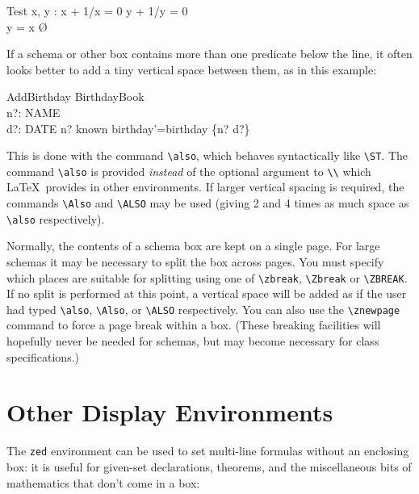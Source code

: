\documentclass[a4paper]{article}
\begin{document}
\begin{example}
\begin{schema}{Test}
x, y : \nat
\ST
x + 1/x = 0 \imp \M y + 1/y = 0 \\
y = x \O \\
\end{schema}
\end{example}

If a schema or other box contains more than one predicate below the
line, it often looks better to add a tiny vertical space between
them, as in this example:

\begin{example}
\begin{schema}{AddBirthday}
  \Delta BirthdayBook \\
  n?: NAME \\
  d?: DATE
\ST
  n? \nem known
\also
  birthday'=birthday \uni \{n? \map d?\}
\end{schema}
\end{example}

This is done with the command \verb|\also|, which behaves syntactically
like \verb|\ST|.
The command \verb|\also| is provided {\em instead\/} of the
optional argument to \verb|\\|
which \LaTeX\ provides in other environments.
If larger vertical spacing is required, the commands
\verb|\Also| and \verb|\ALSO| may be used (giving 2 and 4 times
as much space as \verb|\also| respectively).

Normally, the contents of a schema box are kept on a single page.
For large schemas it may be necessary to split the box across pages.
You must specify which places are suitable for splitting using one of
\verb|\zbreak|, \verb|\Zbreak| or \verb|\ZBREAK|.  If no split is
performed at this point, a vertical space will be added as if the
user had typed \verb|\also|, \verb|\Also|, or \verb|\ALSO| respectively.
You can also use the \verb|\znewpage| command to force a page break within
a box.  (These breaking facilities will hopefully never be needed for schemas,
but may become necessary for class specifications.)

\section{Other Display Environments}

The \verb|zed| environment can be used to set multi-line formulas without
an enclosing box: it is useful for given-set declarations, theorems, and the
miscellaneous bits of mathematics that don't come in a box:
\end{document}
